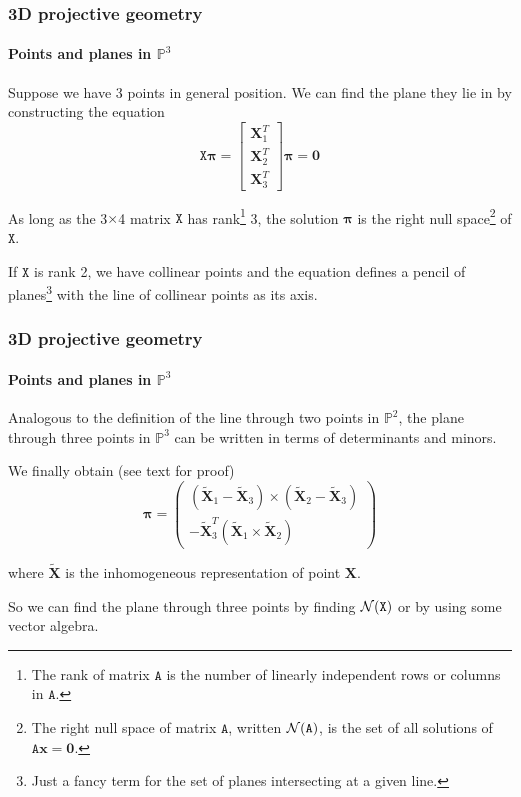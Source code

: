 \documentclass[aspectratio=169]{beamer}
\renewcommand{\vec}[1]{\boldsymbol{#1}}
\newcommand{\mat}[1]{\mathtt{#1}}
\renewcommand{\null}[1]{{\cal N}(#1)}
\def\Pset{\mathbb{P}}
\begin{document}
\begin{frame}
\frametitle{3D projective geometry}
\framesubtitle{Points and planes in $\Pset^3$}

Suppose we have 3 points in general position.  We can find the plane
they lie in by constructing the equation
\begin{equation*}
\mat{X}\vec{\pi} =
\begin{bmatrix} \vec{X}_1^T \\ \vec{X}_2^T \\ \vec{X}_3^T
\end{bmatrix}
\vec{\pi} = \vec{0}
\end{equation*}

\medskip

As long as the 3$\times$4 matrix $\mat{X}$ has rank\footnote{The rank
  of matrix $\mat{A}$ is the number of linearly independent rows or
  columns in $\mat{A}$.} 3, the solution
$\vec{\pi}$ is the \alert{right null space}\footnote{The
right null space of matrix $\mat{A}$, written $\null{\mat{A}}$, is the
set of all solutions of $\mat{A}\vec{x}=\vec{0}$.} of $\mat{X}$.

\medskip

If $\mat{X}$ is rank 2, we have collinear points and the equation
defines a \alert{pencil of planes}\footnote{Just a fancy term for the
set of planes intersecting at a given line.} with the line of
collinear points as its axis.

\end{frame}

\begin{frame}
\frametitle{3D projective geometry}
\framesubtitle{Points and planes in $\Pset^3$}

Analogous to the definition of the line through two points in
$\Pset^2$, the plane through three points in $\Pset^3$ can be written
in terms of determinants and minors.

\medskip

We finally obtain (see text for proof)
\[ \vec{\pi} =
  \begin{pmatrix}
    (\tilde{\vec{X}}_1 - \tilde{\vec{X}}_3) \times
    (\tilde{\vec{X}}_2 - \tilde{\vec{X}}_3) \\
    -\tilde{\vec{X}}_3^T (\tilde{\vec{X}}_1 \times \tilde{\vec{X}}_2)
  \end{pmatrix}
\]

where $\tilde{\vec{X}}$ is the inhomogeneous representation of point
$\vec{X}$.

\medskip

So we can find the plane through three points by finding $\null{\mat{X}}$ or
by using some vector algebra.

\end{frame}
\end{document}
